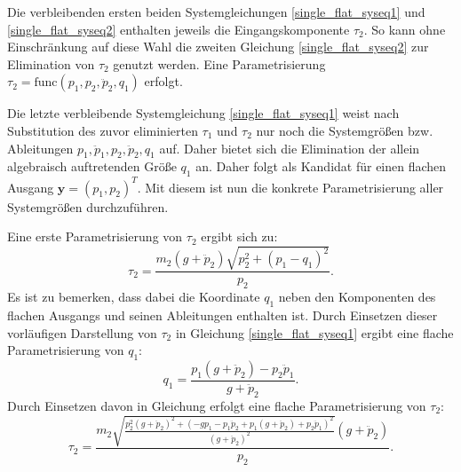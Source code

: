 Die verbleibenden ersten beiden Systemgleichungen \eqref{single_flat_syseq1} und \eqref{single_flat_syseq2} enthalten jeweils die Eingangskomponente $\tau_2$. So kann ohne Einschränkung auf diese Wahl die zweiten Gleichung \eqref{single_flat_syseq2} zur Elimination von $\tau_2$ genutzt werden. Eine Parametrisierung $\tau_2 = \mathrm{func}(p_1, p_2, \ddot{p}_2, q_1)$ erfolgt.

Die letzte verbleibende Systemgleichung \eqref{single_flat_syseq1} weist nach Substitution des zuvor eliminierten $\tau_1$ und $\tau_2$ nur noch die Systemgrößen bzw. Ableitungen $p_1, \ddot{p}_1, p_2, \ddot{p}_2, q_1$ auf. Daher bietet sich die Elimination der allein algebraisch auftretenden Größe $q_1$ an. Daher folgt als Kandidat für einen flachen Ausgang
$\mathbf{y} = (p_1, p_2)^T$. Mit diesem ist nun die konkrete Parametrisierung aller Systemgrößen durchzuführen.

Eine erste Parametrisierung von $\tau_2$ ergibt sich zu:
\begin{equation}
	\label{eq:pre_single_crane_tau2_w_q1}
	\tau_2 = \frac{m_{2} \left(g + \ddot{p}_{2}\right) \sqrt{p_{2}^{2} + \left(p_{1} - q_{1}\right)^{2}}}{p_{2}}.
\end{equation}
Es ist zu bemerken, dass dabei die Koordinate $q_1$ neben den Komponenten des flachen Ausgangs und seinen Ableitungen enthalten ist. Durch Einsetzen dieser vorläufigen Darstellung von $\tau_2$ in Gleichung \eqref{single_flat_syseq1} ergibt eine flache Parametrisierung von $q_1$:
\begin{equation}
	q_1 = \frac{p_{1} \left(g + \ddot{p}_{2}\right) - p_{2} \ddot{p}_{1}}{g + \ddot{p}_{2}}.
\end{equation}
Durch Einsetzen davon in Gleichung \label{eq:pre_single_crane_tau2_w_q1} erfolgt eine flache Parametrisierung von $\tau_2$:
\begin{equation}
	\tau_2 =
	\frac{m_{2} \sqrt{\frac{p_{2}^{2} \left(g + \ddot{p}_{2}\right)^{2} + \left(- g p_{1} - p_{1} \ddot{p}_{2} + p_{1} \left(g + \ddot{p}_{2}\right) + p_{2} \ddot{p}_{1}\right)^{2}}{\left(g + \ddot{p}_{2}\right)^{2}}} \left(g + \ddot{p}_{2}\right)}{p_{2}}.
\end{equation}


